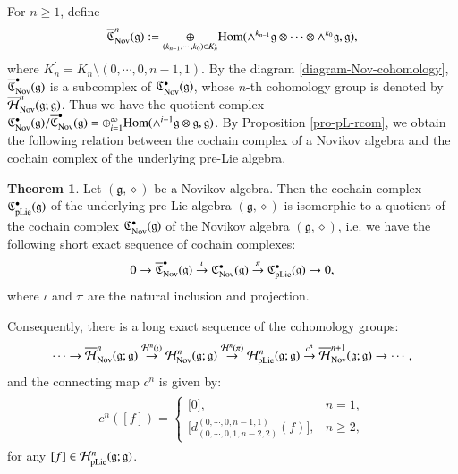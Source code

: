 \documentclass[12pt]{amsart}
\theoremstyle{definition}
\newtheorem{thm}{Theorem}[section]
\newcommand{\g}{\mathfrak g}
\newcommand{\huaH}{\mathcal{H}}
\newcommand{\frkC}{\mathfrak C}
\newcommand{\Hom}{\mathrm{Hom}}
\newcommand{\ot}{\otimes}
\newcommand{\nov}{{\rm Nov}}
\newcommand{\pl}{{\rm pLie}}
\begin{document}
For $n\geq 1$, define
\begin{eqnarray*}
	\overline{\frkC}_{\nov}^n(\g):=\underset{(k_{n-1},\cdots,k_0)\in K_n^{\prime}}{\oplus}\Hom(\wedge^{k_{n-1}}\g\ot\cdots\ot\wedge^{k_0}\g,\g),
\end{eqnarray*}
where $K_n^{\prime}=K_n \setminus(0,\cdots,0,n-1,1)$.  By the diagram \eqref{diagram-Nov-cohomology}, $\overline{\frkC}_{\nov}^\bullet(\g)$ is a   subcomplex of $\frkC_{\nov}^\bullet(\g)$, whose $n$-th cohomology group is denoted by $\overline{\huaH}^n_\nov(\g;\g)$.
Thus we have the quotient  complex $\frkC_{\nov}^\bullet(\g)/\overline{\frkC}_{\nov}^\bullet(\g)=\oplus_{i=1}^\infty\Hom(\wedge^{i-1}\g\ot\g,\g)$. By Proposition \ref{pro-pL-rcom}, we obtain the following relation between the cochain complex of a Novikov algebra and the cochain complex of the underlying pre-Lie algebra.
\begin{thm}\label{pro:pre-Lie-cochain}
	Let $(\g,\diamond)$ be a Novikov algebra. Then the cochain complex $\frkC_{\pl}^\bullet(\g)$ of the underlying pre-Lie algebra $(\g,\diamond)$ is isomorphic to a quotient  of the cochain complex  $\frkC_{\nov}^\bullet(\g)$ of the Novikov algebra $(\g,\diamond)$, i.e. we have the following short exact sequence of cochain complexes:
\begin{equation}
0 \to \overline{\frkC}_{\nov}^\bullet(\g) \stackrel{\iota}{\to}  {\frkC}_{\nov}^\bullet(\g) \stackrel{\pi}{\to} \frkC_{\pl}^\bullet(\g) \to 0,
\end{equation}
where $\iota$ and $\pi$ are the natural inclusion and projection.

Consequently, there is a long exact sequence of the cohomology groups:
\begin{equation}
\cdots \to \overline{\huaH}^n_\nov(\g;\g)   \stackrel{ \huaH^n(\iota)}{\to}  \huaH^n_\nov(\g;\g) \stackrel{ \huaH^n(\pi)}{\to} \huaH^n_\pl(\g;\g)   \stackrel{ c^n}{\to}   \overline{\huaH}^{n+1}_\nov(\g;\g) \to\cdots,
\end{equation}
and the connecting map $c^n$ is given by:
\begin{align*}
\begin{split}
c^n([f])= \left \{
\begin{array}{ll}
    {[}0],                    & n=1,\\
    {[}d_{(0,\cdots,0,1,n-2,2)}^{(0,\cdots,0,n-1,1)}(f)],     & n\geq 2,
\end{array}
\right.
\end{split}
\end{align*}
for any $[f]\in \huaH^n_\pl(\g;\g)$.
\end{thm}
\end{document}
